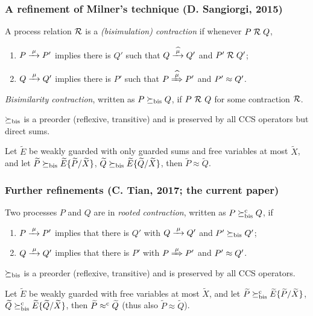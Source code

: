 \begin{frame}
\frametitle{A refinement of Milner's technique (D. Sangiorgi, 2015)}
\begin{small}
\begin{definition}[Contraction]
A process relation ${{\cal R}}$ 
 is a \emph{(bisimulation) contraction} if whenever
 $P\mathrel{\cal R} Q$, %
\begin{enumerate}
\item  $P \arr\mu P'$ implies there is $Q'$ such that $Q \arcap \mu
  Q'$ and $P' \mathrel{\cal R} Q'$;
\item $Q \arr\mu Q'$   implies there is $P'$ such that $P \Arcap \mu
 P'$ and $P' \approx Q'$\enspace.
\end{enumerate}
\emph{Bisimilarity contraction}, written as $P \mathrel{\succeq_\mathrm{bis}} Q$, if $P\ {\cal R}\ Q$ for some contraction ${\cal R}$.
%
\end{definition}
\end{small}
\begin{lemma}
$\mathrel{\succeq_\mathrm{bis}}$ is a preorder (reflexive, transitive) and is preserved by
all CCS operators but direct sums.
\end{lemma}
\begin{theorem}
Let $\tilde{E}$ be weakly guarded with only guarded sums and
free variables at most $\tilde{X}$, and let
$\widetilde{P}\mathrel{\succeq_\mathrm{bis}}\widetilde{E}\{\widetilde{P}/\widetilde{X}\}$,
$\widetilde{Q}\mathrel{\succeq_\mathrm{bis}}\widetilde{E}\{\widetilde{Q}/\widetilde{X}\}$, then $\tilde{P}\approx\tilde{Q}$.
\end{theorem}
\end{frame}

\begin{frame}
\frametitle{Further refinements (C. Tian, 2017; the current paper)}
\begin{definition}
Two processes $P$ and $Q$ are in \emph{rooted contraction}, written as
 $P\mathrel{\succeq^\mathrm{c}_\mathrm{bis}} Q$, if
\begin{enumerate}
\item $P \arr\mu P'$ implies that there is $Q'$ with $Q \arr \mu Q'$
 and $P'\mathrel{\succeq_\mathrm{bis}} Q'$;
\item $Q \arr\mu Q'$   implies that there is $P'$ with $P \Arr \mu
 P'$ and $P' \approx Q'$\enspace.
\end{enumerate}
\end{definition}
\begin{lemma}
$\mathrel{\succeq_\mathrm{bis}}$ is a preorder (reflexive, transitive) and is preserved by
all CCS operators.
\end{lemma}
\begin{theorem}
Let $\tilde{E}$ be weakly guarded with free variables at most $\tilde{X}$, and let
$\widetilde{P}\mathrel{\succeq^\mathrm{c}_\mathrm{bis}}\widetilde{E}\{\widetilde{P}/\widetilde{X}\}$,
$\widetilde{Q}\mathrel{\succeq^\mathrm{c}_\mathrm{bis}}\widetilde{E}\{\widetilde{Q}/\widetilde{X}\}$, then
$\widetilde{P}\mathrel{\approx^{\mathrm{c}}}\widetilde{Q}$ (thus also $\tilde{P}\approx\tilde{Q}$).
\end{theorem}
\end{frame}

